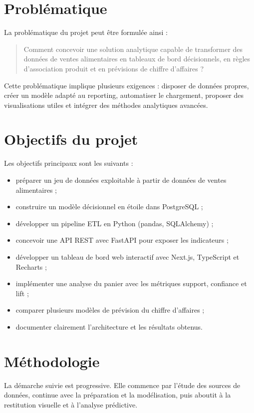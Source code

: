 \documentclass[12pt,a4paper,twoside]{report}
\begin{document}
\section{Problématique}

La problématique du projet peut être formulée ainsi :

\begin{quote}
Comment concevoir une solution analytique capable de transformer des données de ventes alimentaires en tableaux de bord décisionnels, en règles d'association produit et en prévisions de chiffre d'affaires ?
\end{quote}

Cette problématique implique plusieurs exigences : disposer de données propres, créer un modèle adapté au reporting, automatiser le chargement, proposer des visualisations utiles et intégrer des méthodes analytiques avancées.

\section{Objectifs du projet}

Les objectifs principaux sont les suivants :

\begin{itemize}
  \item préparer un jeu de données exploitable à partir de données de ventes alimentaires ;
  \item construire un modèle décisionnel en étoile dans PostgreSQL ;
  \item développer un pipeline ETL en Python (pandas, SQLAlchemy) ;
  \item concevoir une API REST avec FastAPI pour exposer les indicateurs ;
  \item développer un tableau de bord web interactif avec Next.js, TypeScript et Recharts ;
  \item implémenter une analyse du panier avec les métriques support, confiance et lift ;
  \item comparer plusieurs modèles de prévision du chiffre d'affaires ;
  \item documenter clairement l'architecture et les résultats obtenus.
\end{itemize}

\section{Méthodologie}

La démarche suivie est progressive. Elle commence par l'étude des sources de données, continue avec la préparation et la modélisation, puis aboutit à la restitution visuelle et à l'analyse prédictive.
\end{document}
